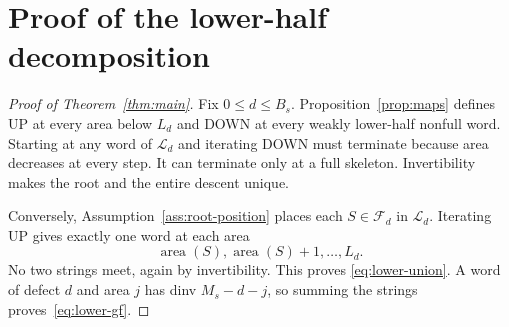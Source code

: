 \documentclass[11pt]{article}
\theoremstyle{definition}
\theoremstyle{remark}
\newcommand{\area}{\operatorname{area}}
\begin{document}
\section{Proof of the lower-half decomposition}

\begin{proof}[Proof of Theorem~\ref{thm:main}]
Fix $0\le d\le B_s$.  Proposition~\ref{prop:maps} defines UP at every area
below $L_d$ and DOWN at every weakly lower-half nonfull word.  Starting at
any word of $\mathcal L_d$ and iterating DOWN must terminate because area
decreases at every step.  It can terminate only at a full skeleton.
Invertibility makes the root and the entire descent unique.

Conversely, Assumption~\ref{ass:root-position} places each
$S\in\mathcal F_d$ in $\mathcal L_d$.  Iterating UP gives exactly one word
at each area
\[
 \area(S),\area(S)+1,\ldots,L_d.
\]
No two strings meet, again by invertibility.  This proves
\eqref{eq:lower-union}.  A word of defect $d$ and area $j$ has dinv
$M_s-d-j$, so summing the strings proves~\eqref{eq:lower-gf}.
\end{proof}
\end{document}
